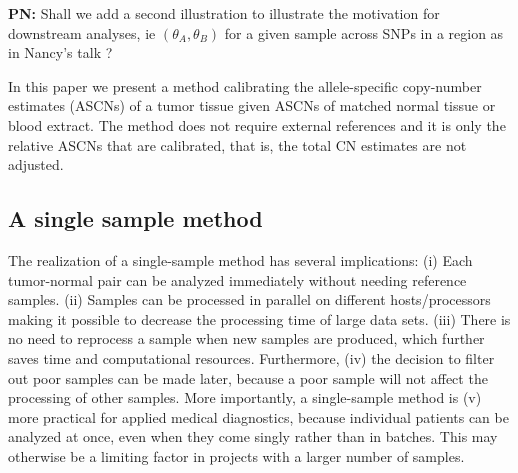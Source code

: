 \documentclass[10pt]{bmc_article}
\newenvironment{bmcformat}{\fussy\setboolean{publ}{true}}{\fussy}
\newenvironment{PN}{\color{blue}\textbf{PN:}}{}
\begin{document}
\begin{bmcformat}
\begin{PN}
  Shall we add a second illustration to illustrate the motivation for downstream analyses, ie  $(\theta_A,\theta_B)$ for a given sample across SNPs in a region as in Nancy's talk ?
\end{PN}

In this paper we present a method calibrating the allele-specific copy-number estimates (ASCNs) of a tumor tissue given ASCNs of matched normal tissue or blood extract.  The method does not require external references and it is only the relative ASCNs that are calibrated, that is, the total CN estimates are not adjusted.



\subsection*{A single sample method}
The realization of a single-sample method has several implications:
(i) Each tumor-normal pair can be analyzed immediately without needing reference samples.
(ii) Samples can be processed in parallel on different hosts/processors making it possible to decrease the processing time of large data sets.
(iii) There is no need to reprocess a sample when new samples are produced, which further saves time and computational resources.
Furthermore, (iv) the decision to filter out poor samples can be made later, because a poor sample will not affect the processing of other samples.
More importantly, a single-sample method is
(v) more practical for applied medical diagnostics, because individual patients can be analyzed at once, even when they come singly rather than in batches.  This may otherwise be a limiting factor in projects with a larger number of samples.


\end{bmcformat}
\end{document}

